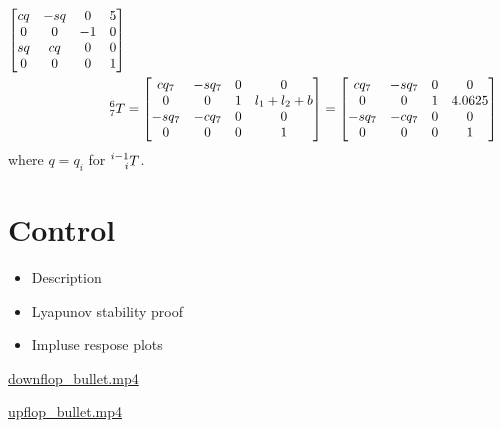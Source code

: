 \documentclass{article}
\begin{document}
\begin{align*}
\begin{bmatrix}
    cq & -sq & 0 & 5 \\
    0 & 0 & -1 & 0 \\
    sq & cq & 0 & 0 \\
    0 & 0 & 0 & 1
  \end{bmatrix} \\
  \prescript{6}{7}T &= \begin{bmatrix}
    cq_7 & -sq_7 & 0 & 0 \\
    0 & 0 & 1 & l_1 + l_2 + b \\
    -sq_7 & -cq_7 & 0 & 0 \\
    0 & 0 & 0 & 1
  \end{bmatrix} = \begin{bmatrix}
    cq_7 & -sq_7 & 0 & 0 \\
    0 & 0 & 1 & 4.0625 \\
    -sq_7 & -cq_7 & 0 & 0 \\
    0 & 0 & 0 & 1
  \end{bmatrix}
\end{align*}
where $q = q_i$ for $\prescript{i-1}{i}T$.

\section{Control}
\begin{itemize}
  \item Description
  \item Lyapunov stability proof
  \item Impluse respose plots
\end{itemize}

\href{./downflop_bullet.mp4}{downflop\_bullet.mp4}

\href{./upflop_bullet.mp4}{upflop\_bullet.mp4}
\end{document}
